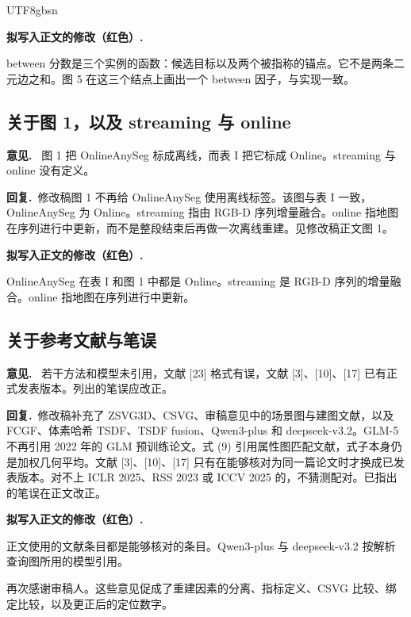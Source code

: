 \documentclass[11pt]{article}
\newcommand{\revcomment}[1]{%
  \par\vspace{0.6em}\noindent\textcolor{revblue}{\textbf{意见.}}\ %
  \textcolor{revblue}{#1}\par\vspace{0.4em}}
\newcommand{\revresponse}[1]{%
  \par\noindent\textbf{回复.}\ #1\par\vspace{0.3em}}
\newcommand{\revchange}[1]{%
  \par\noindent\textbf{拟写入正文的修改（红色）.}\par
  \noindent\textcolor{revred}{#1}\par\vspace{0.8em}}
\begin{document}
\begin{CJK*}{UTF8}{gbsn}
\revchange{between 分数是三个实例的函数：候选目标以及两个被指称的锚点。它不是两条二元边之和。图 5 在这三个结点上画出一个 between 因子，与实现一致。}

\subsection*{关于图 1，以及 streaming 与 online}

\revcomment{图 1 把 OnlineAnySeg 标成离线，而表 I 把它标成 Online。streaming 与 online 没有定义。}

\revresponse{修改稿图 1 不再给 OnlineAnySeg 使用离线标签。该图与表 I 一致，OnlineAnySeg 为 Online。streaming 指由 RGB-D 序列增量融合。online 指地图在序列进行中更新，而不是整段结束后再做一次离线重建。见修改稿正文图 1。}

\revchange{OnlineAnySeg 在表 I 和图 1 中都是 Online。streaming 是 RGB-D 序列的增量融合。online 指地图在序列进行中更新。}

\subsection*{关于参考文献与笔误}

\revcomment{若干方法和模型未引用，文献 [23] 格式有误，文献 [3]、[10]、[17] 已有正式发表版本。列出的笔误应改正。}

\revresponse{修改稿补充了 ZSVG3D、CSVG、审稿意见中的场景图与建图文献，以及 FCGF、体素哈希 TSDF、TSDF fusion、Qwen3-plus 和 deepseek-v3.2。GLM-5 不再引用 2022 年的 GLM 预训练论文。式 (9) 引用属性图匹配文献，式子本身仍是加权几何平均。文献 [3]、[10]、[17] 只有在能够核对为同一篇论文时才换成已发表版本。对不上 ICLR 2025、RSS 2023 或 ICCV 2025 的，不猜测配对。已指出的笔误在正文改正。}

\revchange{正文使用的文献条目都是能够核对的条目。Qwen3-plus 与 deepseek-v3.2 按解析查询图所用的模型引用。}

\bigskip
\noindent 再次感谢审稿人。这些意见促成了重建因素的分离、指标定义、CSVG 比较、绑定比较，以及更正后的定位数字。

\end{CJK*}
\end{document}
